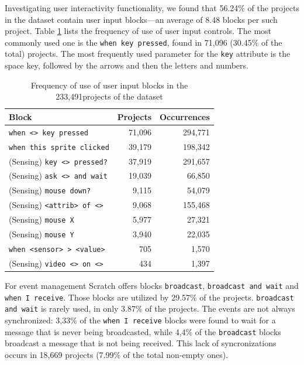 \documentclass{sig-alternate}
\newcommand{\nScriptPrograms}{233,491}
\begin{document}
Investigating user interactivity functionality, we found that 56.24\% of the projects in the dataset contain user input blocks---an average of 8.48 blocks per such project. Table \ref{tbl-userinput} lists the frequency of use of user input controls. The most commonly used one is the \texttt{when key pressed}, found in 71,096 (30.45\% of the total) projects. The most frequently used parameter for the \texttt{key} attribute is the space key, followed by the arrows and then the letters and numbers.

\begin{table}
	\centering
	\begin{tabular}{lrr}
		\hline
		\textbf{Block}&\textbf{Projects}&\textbf{Occurrences}\\
		\hline
	\texttt{when <> key pressed}&71,096&294,771\\
	\texttt{when this sprite clicked}&39,179&198,342\\
	(Sensing) \texttt{key <> pressed?}&37,919&291,657\\
	(Sensing) \texttt{ask <> and wait}&19,039&66,850\\
	(Sensing) \texttt{mouse down?}&9,115&54,079\\
	(Sensing) \texttt{<attrib> of <>}&9,068&155,468\\
	(Sensing) \texttt{mouse X}&5,977&27,321\\
	(Sensing) \texttt{mouse Y}&3,940&22,035\\
	\texttt{when <sensor> > <value>}&705&1,570\\
	(Sensing) \texttt{video <> on <>}&434&1,397\\
		\hline
	\end{tabular}
	\caption{Frequency of use of user input blocks in the \nScriptPrograms projects of the dataset}
	\label{tbl-userinput}
\end{table}

For event management Scratch offers blocks \texttt{broadcast}, \texttt{broadcast and wait} and \texttt{when I receive}. 
Those blocks are utilized by 29.57\% of the projects. \texttt{broadcast and wait} is rarely used, in only 3.87\% of the projects. The events are not always synchronized: 3,33\% of the \texttt{when I receive} blocks were found to wait for a message that is never being broadcasted, while 4,4\% of the \texttt{broadcast} blocks broadcast a message that is not being received. This lack of syncronizations occurs in 18,669 projects (7.99\% of the total non-empty ones).

\noindent
{}
\end{document}
